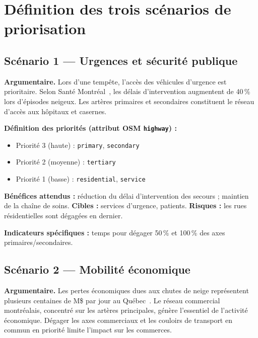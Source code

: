 \documentclass[11pt,a4paper]{article}
\begin{document}
\section{D\'efinition des trois sc\'enarios de priorisation}

\subsection{Sc\'enario 1 --- Urgences et s\'ecurit\'e publique}

\noindent\textbf{Argumentaire.}
Lors d'une temp\^ete, l'acc\`es des v\'ehicules d'urgence est prioritaire.
Selon Sant\'e Montr\'eal~\cite{sante}, les d\'elais d'intervention augmentent de
40\,\% lors d'\'episodes neigeux. Les art\`eres primaires et secondaires
constituent le r\'eseau d'acc\`es aux h\^opitaux et casernes.

\noindent\textbf{D\'efinition des priorit\'es (attribut OSM \texttt{highway}) :}
\begin{itemize}
  \item Priorit\'e 3 (haute) : \texttt{primary}, \texttt{secondary}
  \item Priorit\'e 2 (moyenne) : \texttt{tertiary}
  \item Priorit\'e 1 (basse) : \texttt{residential}, \texttt{service}
\end{itemize}

\noindent\textbf{B\'en\'efices attendus :}
r\'eduction du d\'elai d'intervention des secours ;
maintien de la cha\^ine de soins.
\textbf{Cibles :} services d'urgence, patients.
\textbf{Risques :} les rues r\'esidentielles sont d\'egag\'ees en dernier.

\noindent\textbf{Indicateurs sp\'ecifiques :}
temps pour d\'egager 50\,\% et 100\,\% des axes primaires/secondaires.

\subsection{Sc\'enario 2 --- Mobilit\'e \'economique}

\noindent\textbf{Argumentaire.}
Les pertes \'economiques dues aux chutes de neige repr\'esentent plusieurs
centaines de M\$ par jour au Qu\'ebec~\cite{statcan}. Le r\'eseau commercial
montr\'ealais, concentr\'e sur les art\`eres principales, g\'en\`ere l'essentiel
de l'activit\'e \'economique. D\'egager les axes commerciaux et les couloirs de
transport en commun en priorit\'e limite l'impact sur les commerces.
\end{document}
